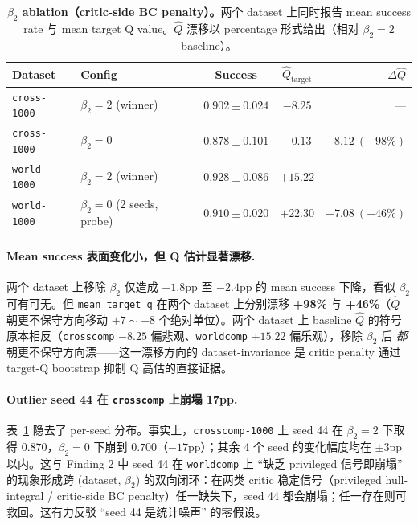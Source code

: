 \begin{table}[t]
\centering
\small
\caption{\textbf{$\beta_2$ ablation（critic-side BC penalty）。}两个 dataset 上同时报告 mean success rate 与 mean target Q value。$\hat{Q}$ 漂移以 percentage 形式给出（相对 $\beta_2=2$ baseline）。}
\label{tab:beta2_ablation}
\begin{tabular}{llccr}
\toprule
\textbf{Dataset} & \textbf{Config} & \textbf{Success} & \textbf{$\hat{Q}_{\text{target}}$} & \textbf{$\Delta \hat{Q}$} \\
\midrule
\texttt{cross-1000} & $\beta_2=2$ (winner)         & $0.902 \pm 0.024$ & $-8.25$ & — \\
\texttt{cross-1000} & $\beta_2=0$                  & $0.878 \pm 0.101$ & $-0.13$ & $+8.12\ (+98\%)$ \\
\midrule
\texttt{world-1000} & $\beta_2=2$ (winner)         & $0.928 \pm 0.086$ & $+15.22$ & — \\
\texttt{world-1000} & $\beta_2=0$ (2 seeds, probe) & $0.910 \pm 0.020$ & $+22.30$ & $+7.08\ (+46\%)$ \\
\bottomrule
\end{tabular}
\end{table}

\paragraph{Mean success 表面变化小，但 Q 估计显著漂移.}
两个 dataset 上移除 $\beta_2$ 仅造成 $-1.8$pp 至 $-2.4$pp 的 mean success 下降，看似 $\beta_2$ 可有可无。但 \texttt{mean\_target\_q} 在两个 dataset 上分别漂移 \textbf{+98\%} 与 \textbf{+46\%}（$\hat{Q}$ 朝更不保守方向移动 $+7\sim+8$ 个绝对单位）。两个 dataset 上 baseline $\hat{Q}$ 的符号原本相反（\texttt{crosscomp} $-8.25$ 偏悲观、\texttt{worldcomp} $+15.22$ 偏乐观），移除 $\beta_2$ 后 \emph{都}朝更不保守方向漂——这一漂移方向的 dataset-invariance 是 critic penalty 通过 target-Q bootstrap 抑制 Q 高估的直接证据。

\paragraph{Outlier seed 44 在 \texttt{crosscomp} 上崩塌 17pp.}
表~\ref{tab:beta2_ablation} 隐去了 per-seed 分布。事实上，\texttt{crosscomp-1000} 上 seed 44 在 $\beta_2=2$ 下取得 $0.870$，$\beta_2=0$ 下崩到 $0.700$（$-17$pp）；其余 4 个 seed 的变化幅度均在 $\pm 3$pp 以内。这与 Finding 2 中 seed 44 在 \texttt{worldcomp} 上 ``缺乏 privileged 信号即崩塌'' 的现象形成跨 (dataset, $\beta_2$) 的双向闭环：在两类 critic 稳定信号（privileged hull-integral / critic-side BC penalty）任一缺失下，seed 44 都会崩塌；任一存在则可救回。这有力反驳 ``seed 44 是统计噪声'' 的零假设。


